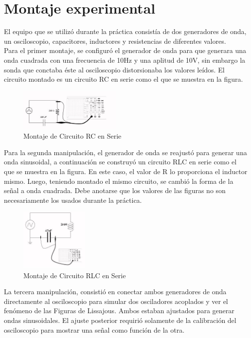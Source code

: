 \documentclass[%
 reprint,
 amsmath,amssymb,
 aps,
]{revtex4-1}
\begin{document}
\section{\label{sec:level1}Montaje experimental}
El equipo que se utiliz\'o durante la práctica consist\'ia de dos generadores de onda, un osciloscopio, capacitores, inductores y resistencias de diferentes valores.\\

Para el primer montaje, se configur\'o el generador de onda para que generara una onda cuadrada con una frecuencia de 10Hz y una aplitud de 10V, sin embargo la sonda que conctaba \'este al osciloscopio distorsionaba los valores le\'idos. El circuito montado es un circuito RC en serie como el que se muestra en la figura.\\

\begin{figure}[h!]
\caption{Montaje de Circuito RC en Serie}
\centering
\includegraphics[width=0.45\textwidth]{rc}
\end{figure}

Para la segunda manipulaci\'on, el generador de onda se reajust\'o para generar una onda sinusoidal, a continuaci\'on se construy\'o un circuito RLC en serie como el que se muestra en la figura. En este caso, el valor de R lo proporciona el inductor mismo. Luego, teniendo montado el mismo circuito, se cambi\'o la forma de la señal a onda cuadrada. Debe anotarse que los valores de las figuras no son necesariamente los usados durante la pr\'actica. \\

\begin{figure}[h!]
\caption{Montaje de Circuito RLC en Serie}
\centering
\includegraphics[width=0.30\textwidth]{rlc}
\end{figure}


La tercera manipulaci\'on, consisti\'o en conectar ambos generadores de onda directamente al osciloscopio para simular dos osciladores acoplados y ver el fen\'omeno de las Figuras de Lissajous. Ambos estaban ajustados para generar ondas sinusoidales. El ajuste posterior requiri\'o solamente de la calibraci\'on del osciloscopio para mostrar una señal como funci\'on de la otra. 
\end{document}
